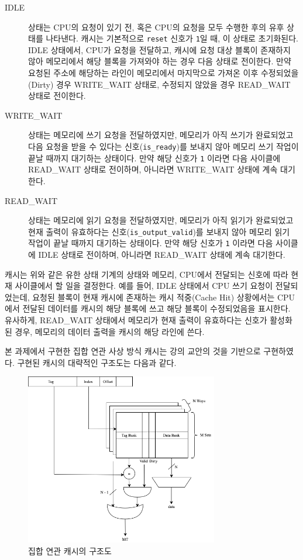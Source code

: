 \documentclass[openright, a4paper]{article}
\newcommand{\code}[1]{\texttt{#1}}
\begin{document}
\begin{description}
  \item[IDLE]상태는 CPU의 요청이 있기 전, 혹은 CPU의 요청을 모두 수행한 후의
  유후 상태를 나타낸다. 캐시는 기본적으로 \code{reset} 신호가 \code{1}일 때,
  이 상태로 초기화된다. IDLE 상태에서, CPU가 요청을 전달하고, 캐시에 요청 대상
  블록이 존재하지 않아 메모리에서 해당 블록을 가져와야 하는 경우 다음 상태로
  전이한다. 만약 요청된 주소에 해당하는 라인이 메모리에서 마지막으로 가져온 이후
  수정되었을(Dirty) 경우 WRITE_WAIT 상태로, 수정되지 않았을 경우 READ_WAIT 상태로
  전이한다.

  \item[WRITE_WAIT]상태는 메모리에 쓰기 요청을 전달하였지만, 메모리가 아직 쓰기가
  완료되었고 다음 요청을 받을 수 있다는 신호(\code{is_ready})를 보내지 않아
  메모리 쓰기 작업이 끝날 때까지 대기하는 상태이다. 만약 해당 신호가 
  \code{1} 이라면 다음 사이클에 READ_WAIT 상태로 전이하며, 아니라면 WRITE_WAIT
  상태에 계속 대기한다.

  \item[READ_WAIT]상태는 메모리에 읽기 요청을 전달하였지만, 메모리가 아직 읽기가
  완료되었고 현재 출력이 유효하다는 신호(\code{is_output_valid})를 보내지 않아
  메모리 읽기 작업이 끝날 때까지 대기하는 상태이다. 만약 해당 신호가 \code{1}
  이라면 다음 사이클에 IDLE 상태로 전이하며, 아니라면 READ_WAIT 상태에 계속 
  대기한다.
\end{description}

캐시는 위와 같은 유한 상태 기계의 상태와 메모리, CPU에서 전달되는 신호에 따라
현재 사이클에서 할 일을 결정한다. 예를 들어, IDLE 상태에서 CPU 쓰기 요청이
전달되었는데, 요청된 블록이 현재 캐시에 존재하는 캐시 적중(Cache Hit) 상황에서는
CPU에서 전달된 데이터를 캐시의 해당 블록에 쓰고 해당 블록이 수정되었음을 
표시한다. 유사하게, READ_WAIT 상태에서 메모리가 현재 출력이 유효하다는 신호가
활성화된 경우, 메모리의 데이터 출력을 캐시의 해당 라인에 쓴다.

본 과제에서 구현한 집합 연관 사상 방식 캐시는 강의 교안의 것을 기반으로
구현하였다. 구현된 캐시의 대략적인 구조도는 다음과 같다.

\hfill

{
    \begin{figure}[!h]
        \centering
        \includegraphics[width=0.75\textwidth]{img/schematic.png}
        \caption{집합 연관 캐시의 구조도}
    \end{figure}
}
\end{document}

